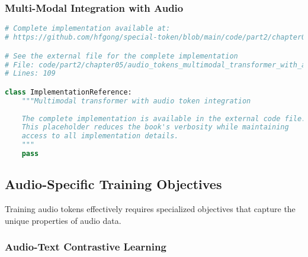 \subsubsection{Multi-Modal Integration with Audio}

\begin{lstlisting}[language=Python, caption={Multimodal transformer with audio token integration}]
# Complete implementation available at:
# https://github.com/hfgong/special-token/blob/main/code/part2/chapter05/audio_tokens_multimodal_transformer_with_au.py

# See the external file for the complete implementation
# File: code/part2/chapter05/audio_tokens_multimodal_transformer_with_au.py
# Lines: 109

class ImplementationReference:
    """Multimodal transformer with audio token integration
    
    The complete implementation is available in the external code file.
    This placeholder reduces the book's verbosity while maintaining
    access to all implementation details.
    """
    pass
\end{lstlisting}

\subsection{Audio-Specific Training Objectives}

Training audio tokens effectively requires specialized objectives that capture the unique properties of audio data.

\subsubsection{Audio-Text Contrastive Learning}

